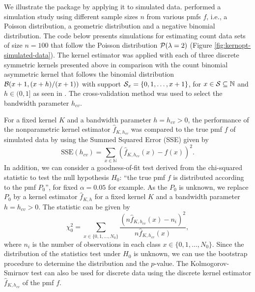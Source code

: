 We illustrate the  package by applying it to simulated data. \citet{SengaDurrieu2024} performed a simulation study using different sample sizes \(n\) from various pmfs \(f\), i.e., a Poisson distribution, a geometric distribution and a negative binomial distribution. The code below presents simulations for estimating count data sets of size \(n=100\) that follow the Poisson distribution \({\cal P} (\lambda=2)\) (Figure \ref{fig:kernopt-simulated-data}). The kernel estimator was applied with each of three discrete symmetric kernels presented above in comparison with the count binomial asymmetric kernel that follows the binomial distribution \({\cal B}(x+1,(x+h)/(x+1))\) with support \({\cal S}_x=\{0,1,\ldots,x+1\}\), for \(x \in {\cal S} \subseteq {\mathbb N}\) and \(h \in (0,1]\) as seen in \citet{KokonSenga11}. The cross-validation method was used to select the bandwidth parameter \(h_{cv}\).

For a fixed kernel \(K\) and a bandwidth parameter \(h=h_{cv}>0\), the performance of the nonparametric kernel estimator \(\widehat{f}_{K,h_{cv}}\) was compared to the true pmf \(f\) of simulated data by using the Summed Squared Error (SSE) given by
\[\mathrm{SSE}(h_{cv})=\sum_{x\in\mathbb{N}}(\widehat{f}_{K,h_{cv}}(x) - f(x))^{2}. \]
In addition, we can consider a goodness-of-fit test derived from the chi-squared statistic to test the null hypothesis \(H_0\): ``the true pmf \(f\) is distributed according to the pmf \(P_{0}\)'', for fixed \(\alpha=0.05\) for example. As the \(P_{0}\) is unknown, we replace \(P_{0}\) by a kernel estimator \(\widehat{f}_{K,h}\) for a fixed kernel \(K\) and a bandwidth parameter \(h=h_{cv}>0\). The statistic can be given by\\
\begin{equation*}
\chi _{0}^{2}=\sum_{x \in \{0,1,\ldots,N_{0}\}}\frac{\left(
n\widehat{f}_{K,h_{cv}}(x)- n_{i}\right)^{2}}{n\widehat{f}_{K,h_{cv}}(x)},
\end{equation*}
where \(n_{i}\) is the number of observations in each class \(x \in \{0,1,\ldots,N_{0}\}\). Since the distribution of the statistics test under \(H_0\) is unknown, we can use the bootstrap procedure to determine the distribution and the \(p\)-value. The Kolmogorov-Smirnov test can also be used for discrete data using the discrete kernel estimator \(\widehat{f}_{K,h_{cv}}\) of the pmf \(f\).

